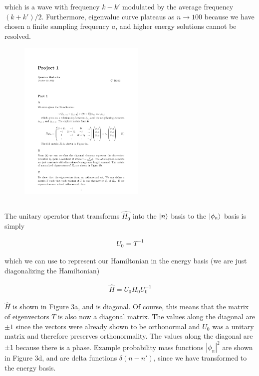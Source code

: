 \documentclass[%
 reprint,
 amsmath,amssymb,
 aps,
]{revtex4-2}
\begin{document}
which is a wave with frequency $k-k'$ modulated by the average frequency $(k+k')/2$. 
Furthermore, eigenvalue curve plateaus as $n\rightarrow 100$ because we have chosen a finite sampling frequency $a$, and higher energy solutions cannot be resolved.


\begin{figure}[t!]
\centering
\includegraphics[width=6cm]{p1_2}
\caption{}
\label{fig:method}
\end{figure}

\subsection{}

The unitary operator that transforms $\hat{H_{0}}$ into the $\ket{n}$ basis to the $\ket{\phi_{n}}$ basis is simply

\begin{align*}
U_{0} = T^{-1}
\end{align*}

which we can use to represent our Hamiltonian in the energy basis (we are just diagonalizing the Hamiltonian)

\begin{align*}
\hat{H} = U_{0} H_{0} U_{0}^{-1}
\end{align*}

$\hat{H}$ is shown in Figure 3a, and is diagonal. Of course, this means that the matrix of eigenvectors $T$ is also now a diagonal matrix. The values along the diagonal are $\pm 1$ since the vectors were already shown to be orthonormal and $U_{0}$ was a unitary matrix and therefore preserves orthonormality. The values along the diagonal are $\pm 1$ because there is a phase. Example probability mass functions $|\phi_{n}|^{2}$ are shown in Figure 3d, and are delta functions $\delta(n-n')$, since we have transformed to the energy basis.
\end{document}
